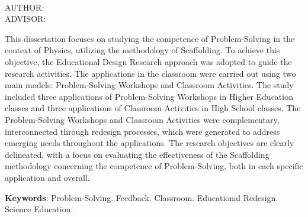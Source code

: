\begin{resumo}[ABSTRACT]
\vspace{2em}
\begin{center}

\textbf{\expandafter\MakeUppercase\expandafter{\imprimirtituloestrangeiro}}\\
AUTHOR: \imprimirautor\\
ADVISOR: \imprimirorientador
\end{center}
\vspace{1em}
This dissertation focuses on studying the competence of Problem-Solving in the context of Physics, utilizing the methodology of Scaffolding. To achieve this objective, the Educational Design Research approach was adopted to guide the research activities. The applications in the classroom were carried out using two main models: Problem-Solving Workshops and Classroom Activities. The study included three applications of Problem-Solving Workshops in Higher Education classes and three applications of Classroom Activities in High School classes. The Problem-Solving Workshops and Classroom Activities were complementary, interconnected through redesign processes, which were generated to address emerging needs throughout the applications. The research objectives are clearly delineated, with a focus on evaluating the effectiveness of the Scaffolding methodology concerning the competence of Problem-Solving, both in each specific application and overall.

\vspace{2em}
\textbf{Keywords}: Problem-Solving. Feedback. Classroom. Educational Redesign. Science Education.
\end{resumo}